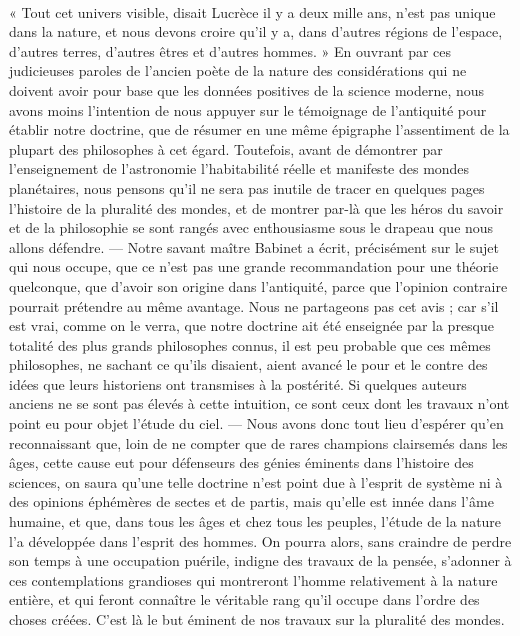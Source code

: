 \documentclass[a4paper, 11pt, oneside, landscape]{article}
\begin{document}
\paragraph{}
« Tout cet univers visible, disait Lucrèce il y a deux mille ans, n'est pas unique dans la nature, et nous devons croire qu'il y a, dans d'autres régions de l'espace, d'autres terres, d'autres êtres et d'autres hommes. » En ouvrant par ces judicieuses paroles de l'ancien poète de la nature des considérations qui ne doivent avoir pour base que les données positives de la science moderne, nous avons moins l'intention de nous appuyer sur le témoignage de l'antiquité pour établir notre doctrine, que de résumer en une même épigraphe l'assentiment de la plupart des philosophes à cet égard. Toutefois, avant de démontrer par l'enseignement de l'astronomie l'habitabilité réelle et manifeste des mondes planétaires, nous pensons qu'il ne sera pas inutile de tracer en quelques pages l'histoire de la pluralité des mondes, et de montrer par-là que les héros du savoir et de la philosophie se sont rangés avec enthousiasme sous le drapeau que nous allons défendre. --- Notre savant maître Babinet a écrit, précisément sur le sujet qui nous occupe, que ce n'est pas une grande recommandation pour une théorie quelconque, que d'avoir son origine dans l'antiquité, parce que l'opinion contraire pourrait prétendre au même avantage. Nous ne partageons pas cet avis ; car s'il est vrai, comme on le verra, que notre doctrine ait été enseignée par la presque totalité des plus grands philosophes connus, il est peu probable que ces mêmes philosophes, ne sachant ce qu'ils disaient, aient avancé le pour et le contre des idées que leurs historiens ont transmises à la postérité. Si quelques auteurs anciens ne se sont pas élevés à cette intuition, ce sont ceux dont les travaux n'ont point eu pour objet l'étude du ciel. --- Nous avons donc tout lieu d'espérer qu'en reconnaissant que, loin de ne compter que de rares champions clairsemés dans les âges, cette cause eut pour défenseurs des génies éminents dans l'histoire des sciences, on saura qu'une telle doctrine n'est point due à l'esprit de système ni à des opinions éphémères de sectes et de partis, mais qu'elle est innée dans l'âme humaine, et que, dans tous les âges et chez tous les peuples, l'étude de la nature l'a développée dans l'esprit des hommes. On pourra alors, sans craindre de perdre son temps à une occupation puérile, indigne des travaux de la pensée, s'adonner à ces contemplations grandioses qui montreront l'homme relativement à la nature entière, et qui feront connaître le véritable rang qu'il occupe dans l'ordre des choses créées. C'est là le but éminent de nos travaux sur la pluralité des mondes.
\end{document}
